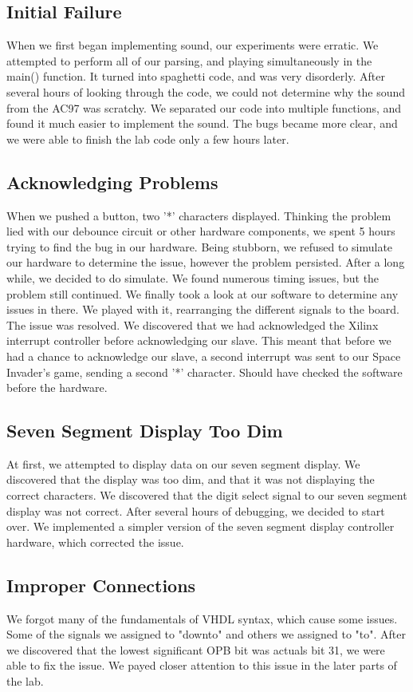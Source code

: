 \documentclass[11pt,letter,oneside]{report}
\begin{document}
\subsection{Initial Failure}
When we first began implementing sound, our experiments were erratic. We attempted to perform all of our parsing, and playing simultaneously in the main() function. It turned into spaghetti code, and was very disorderly. After several hours of looking through the code, we could not determine why the sound from the AC97 was scratchy. We separated our code into multiple functions, and found it much easier to implement the sound. The bugs became more clear, and we were able to finish the lab code only a few hours later.

\subsection{Acknowledging Problems}
When we pushed a button, two '*' characters displayed. Thinking the problem lied with our debounce circuit or other hardware components, we spent 5 hours trying to find the bug in our hardware. Being stubborn, we refused to simulate our hardware to determine the issue, however the problem persisted. After a long while, we decided to do simulate. We found numerous timing issues, but the problem still continued. We finally took a look at our software to determine any issues in there. We played with it, rearranging the different signals to the board. The issue was resolved. We discovered that we had acknowledged the Xilinx interrupt controller before acknowledging our slave. This meant that before we had a chance to acknowledge our slave, a second interrupt was sent to our Space Invader's game, sending a second '*' character. Should have checked the software before the hardware.

\subsection{Seven Segment Display Too Dim}
At first, we attempted to display data on our seven segment display. We discovered that the display was too dim, and that it was not displaying the correct characters. We discovered that the digit select signal to our seven segment display was not correct. After several hours of debugging, we decided to start over. We implemented a simpler version of the seven segment display controller hardware, which corrected the issue.

\subsection{Improper Connections}
We forgot many of the fundamentals of VHDL syntax, which cause some issues. Some of the signals we assigned to "downto" and others we assigned to "to". After we discovered that the lowest significant OPB bit was actuals bit 31, we were able to fix the issue. We payed closer attention to this issue in the later parts of the lab. 
\end{document}
